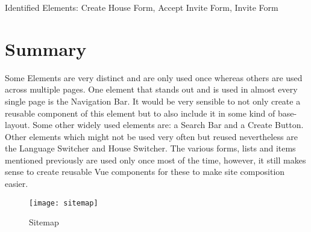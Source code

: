 Identified Elements: Create House Form, Accept Invite Form, Invite Form

\section{Summary}
Some Elements are very distinct and are only used once whereas others are used across multiple pages. One element that stands out and is used in almost every single page is the Navigation Bar. It would be very sensible to not only create a reusable component of this element but to also include it in some kind of base-layout. Some other widely used elements are: a Search Bar and a Create Button. Other elements which might not be used very often but reused nevertheless are the Language Switcher and House Switcher. The various forms, lists and items mentioned previously are used only once most of the time, however, it still makes sense to create reusable Vue components for these to make site composition easier.

\begin{figure}[H]
    \begin{center}
    \texttt{[image: sitemap]}
    \end{center}
    \caption{Sitemap}
    \label{fig:sitemap}
\end{figure}